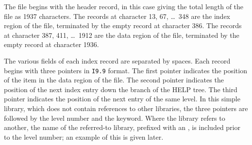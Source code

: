 The file begins with the header record, in this case giving the
total length of the file as 1937 characters.
The records at character 13, 67, \ldots\ 348 are the index
region of the file, terminated by the empty record at character 386.
The records at character 387, 411, \ldots\ 1912 are the
data region of the file, terminated by the
empty record at character 1936.

The various fields of each index record are separated by spaces.
Each record begins with three pointers in \verb|I9.9| format.
The first pointer indicates the position of
the item in the data region of the file.  The second pointer
indicates the position of
the next index entry down the branch of the HELP tree.  The
third pointer indicates the position of the next entry of the
same level.
In this simple library, which does not contain references to
other libraries, the three pointers are followed by the
level number and the keyword.  Where the library refers to
another, the name of the referred-to library, prefixed with an ,
is included prior to the level number;  an example of this is
given later.

